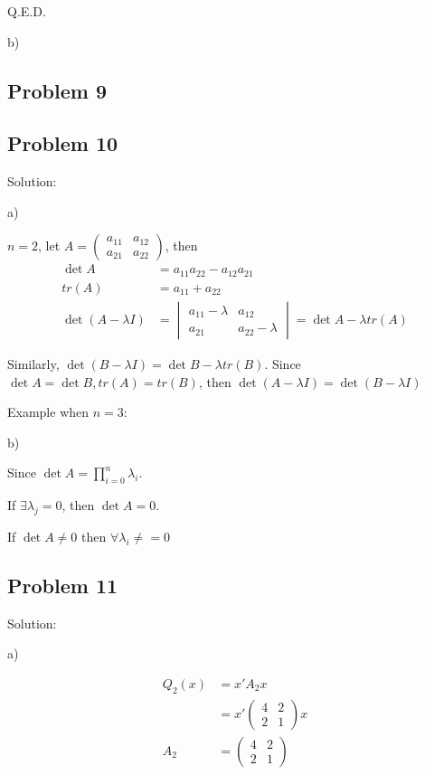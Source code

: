 \documentclass[letterpaper, 11pt]{article}
\newcommand{\1}{\mathds{1}}	%
\theoremstyle{definition}
\begin{document}
Q.E.D.

b)



\subsection*{Problem 9}

\subsection*{Problem 10}

Solution:

a)

$n=2$, let $A = \begin{pmatrix}
        a_{11} & a_{12} \\
        a_{21} & a_{22}
    \end{pmatrix}$, then \begin{align*}
    \det A             & = a_{11}a_{22} - a_{12}a_{21}            \\
    tr(A)              & = a_{11} + a_{22}                        \\
    \det (A-\lambda I) & = \begin{vmatrix}
                               a_{11} -\lambda & a_{12}          \\
                               a_{21}          & a_{22} -\lambda
                           \end{vmatrix} = \det A - \lambda tr(A)
\end{align*}

Similarly, $\det (B - \lambda I) = \det B - \lambda tr(B)$. Since $\det A = \det B, tr(A) = tr(B)$, then $\det (A-\lambda I)  = \det (B - \lambda I)$

Example when $n = 3$:


b)

Since $\det A = \prod_{i=0}^{n}\lambda_i$.

If $\exists \lambda_{j} = 0$, then $\det A = 0$.

If $\det A \neq 0$ then $\forall \lambda_{i} \neq =0$


\subsection*{Problem 11}

Solution:

a)

\begin{align*}
    Q_{2}(x) & =x'A_{2}x         \\
             & =x'\begin{pmatrix}
                      4 & 2 \\
                      2 & 1
                  \end{pmatrix}x \\
    A_{2}    & = \begin{pmatrix}
                     4 & 2 \\
                     2 & 1
                 \end{pmatrix}
\end{align*}
\end{document}
